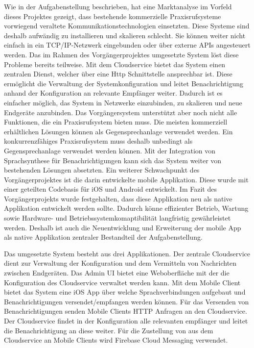 Wie in der Aufgabenstellung beschrieben, hat eine Marktanalyse im Vorfeld dieses Projektes gezeigt, dass bestehende kommerzielle Praxisrufsysteme vorwiegend veraltete Kommunikationstechnologien einsetzten.
Diese Systeme sind deshalb aufwändig zu installieren und skalieren schlecht.
Sie können weiter nicht einfach in ein TCP/IP-Netzwerk eingebunden oder über externe APIs angesteuert werden.\cite{aufgabenstellung}
Das im Rahmen des Vorgängerprojektes umgesetzte System löst diese Probleme bereits teilweise.
Mit dem Cloudservice bietet das System einen zentralen Dienst, welcher über eine Http Schnittstelle ansprechbar ist.
Diese ermöglicht die Verwaltung der Systemkonfiguration und leitet Benachrichtigung anhand der Konfiguration an relevante Empfänger weiter.
Dadurch ist es einfacher möglich, das System in Netzwerke einzubinden, zu skalieren und neue Endgeräte anzubinden.
Das Vorgängersystem unterstützt aber noch nicht alle Funktionen, die ein Praxisrufsystem bieten muss.
Die meisten kommerziell erhältlichen Lösungen können als Gegensprechanlage verwendet werden\cite{aufgabenstellung}.
Ein konkurrenzfähiges Praxisrufsystem muss deshalb unbedingt als Gegensprechanlage verwendet werden können.
Mit der Integration von Sprachsynthese für Benachrichtigungen kann sich das System weiter von bestehenden Lösungen absetzten.
Ein weiterer Schwachpunkt des Vorgängerprojektes ist die darin entwickelte mobile Applikation.
Diese wurde mit einer geteilten Codebasis für iOS und Android entwickelt.
Im Fazit des Vorgängerprojekts wurde festgehalten, dass diese Applikation neu als native Applikation entwickelt werden sollte.
Dadurch könne effizienter Betrieb, Wartung sowie Hardware- und Betriebssystemkomaptibilität langfristig gewährleistet werden.\cite{ip5}
Deshalb ist auch die Neuentwicklung und Erweiterung der mobile App als native Applikation zentraler Bestandteil der Aufgabenstellung.

Das umgesetzte System besteht aus drei Applikationen.
Der zentrale Cloudservice dient zur Verwaltung der Konfiguration und dem Vermitteln von Nachrichten zwischen Endgeräten.
Das Admin UI bietet eine Weboberfläche mit der die Konfiguration des Cloudservice verwaltet werden kann.
Mit dem Mobile Client bietet das System eine iOS App über welche Sprachverbindungen aufgebaut und Benachrichtigungen versendet/empfangen werden können.
Für das Versenden von Benachrichtigungen senden Mobile Clients HTTP Anfragen an den Cloudservice.
Der Cloudservice findet in der Konfiguration alle relevanten empfänger und leitet die Benachrichtigung an diese weiter.
Für die Zustellung von aus dem Cloudservice an Mobile Clients wird Firebase Cloud Messaging verwendet.

